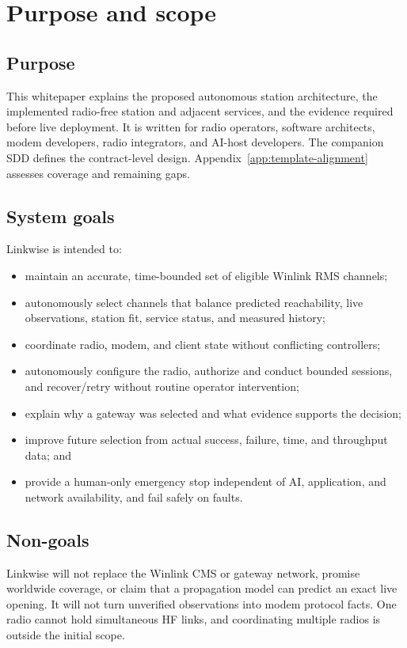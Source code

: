 \documentclass[11pt,a4paper]{article}
\begin{document}
\section{Purpose and scope}

\subsection{Purpose}
This whitepaper explains the proposed autonomous station architecture, the
implemented radio-free station and adjacent services, and the evidence
required before live deployment. It is written for radio operators, software
architects, modem developers, radio integrators, and AI-host developers.
The companion SDD defines the contract-level design. Appendix~\ref{app:template-alignment}
assesses coverage and remaining gaps.

\subsection{System goals}
Linkwise is intended to:
\begin{itemize}
  \item maintain an accurate, time-bounded set of eligible Winlink RMS channels;
  \item autonomously select channels that balance predicted reachability, live observations, station fit, service status, and measured history;
  \item coordinate radio, modem, and client state without conflicting controllers;
  \item autonomously configure the radio, authorize and conduct bounded sessions, and recover/retry without routine operator intervention;
  \item explain why a gateway was selected and what evidence supports the decision;
  \item improve future selection from actual success, failure, time, and throughput data; and
  \item provide a human-only emergency stop independent of AI, application, and network availability, and fail safely on faults.
\end{itemize}

\subsection{Non-goals}
Linkwise will not replace the Winlink CMS or gateway network, promise worldwide coverage, or claim that a propagation model can predict an exact live opening. It will not turn unverified observations into modem protocol facts. One radio cannot hold simultaneous HF links, and coordinating multiple radios is outside the initial scope.
\end{document}
